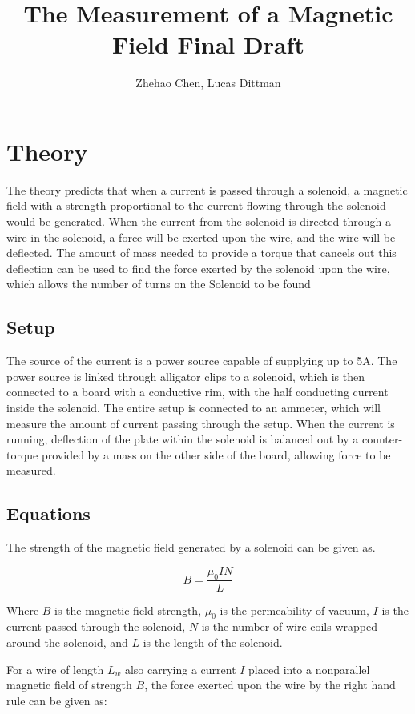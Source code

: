 \documentclass[11pt]{report}
\author{Zhehao Chen, Lucas Dittman}
\title{The Measurement of a Magnetic Field Final Draft}
\begin{document}
\maketitle

\section{Theory}
The theory predicts that when a current is passed through a solenoid, a magnetic field with a strength proportional to the current flowing through the solenoid would be generated. When the current from the solenoid is directed through a wire in the solenoid, a force will be exerted upon the wire, and the wire will be deflected. The amount of mass needed to provide a torque that cancels out this deflection can be used to find the force exerted by the solenoid upon the wire, which allows the number of turns on the Solenoid to be found

\subsection{Setup}
The source of the current is a power source capable of supplying up to 5A. The power source is linked through alligator clips to a solenoid, which is then connected to a board with a conductive rim, with the half conducting current inside the solenoid. The entire setup is connected to an ammeter, which will measure the amount of current passing through the setup. When the current is running, deflection of the plate within the solenoid is balanced out by a counter-torque provided by a mass on the other side of the board, allowing force to be measured.

\subsection{Equations}
The strength of the magnetic field generated by a solenoid can be given as.

\begin{equation} \label{B}
B = \frac{\mu_{0}IN}{L}
\end{equation}

Where $B$ is the magnetic field strength, $\mu_0$ is the permeability of vacuum, $I$ is the current passed through the solenoid, $N$ is the number of wire coils wrapped around the solenoid, and $L$ is the length of the solenoid.

For a wire of length $L_w$ also carrying a current $I$ placed into a nonparallel magnetic field of strength $B$, the force exerted upon the wire by the right hand rule can be given as:
\end{document}
